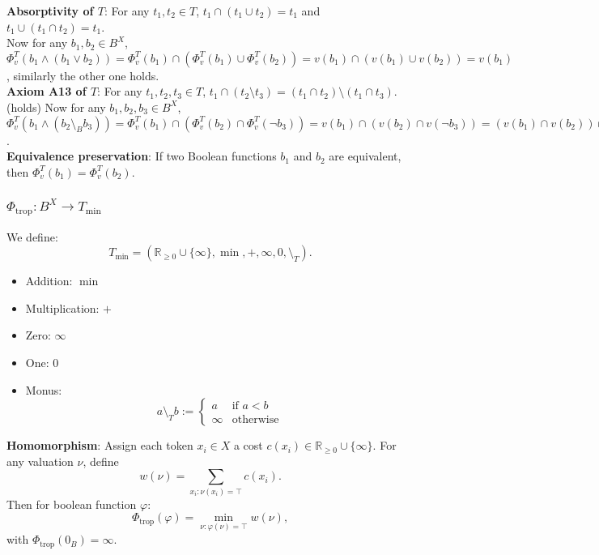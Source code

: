 \textbf{Absorptivity of $T$}:\newline
For any $t_1,t_2 \in T$, $t_1 \cap (t_1 \cup t_2) = t_1$ and $t_1 \cup (t_1 \cap t_2) = t_1$.\\
Now for any $b_1,b_2 \in B^X$, $\Phi_v^T(b_1 \wedge (b_1 \lor b_2)) = \Phi_v^T(b_1) \cap (\Phi_v^T(b_1) \cup \Phi_v^T(b_2)) = v(b_1) \cap (v(b_1) \cup v(b_2)) = v(b_1)$, similarly the other one holds.\\
\textbf{Axiom A13 of $T$}:\newline
For any $t_1,t_2,t_3 \in T$, $t_1 \cap (t_2 \setminus t_3) = (t_1 \cap t_2) \setminus (t_1 \cap t_3)$.\\ (holds)
Now for any $b_1,b_2,b_3 \in B^X$, $\Phi_v^T(b_1 \wedge (b_2 \setminus_B b_3)) = \Phi_v^T(b_1) \cap (\Phi_v^T(b_2) \cap \Phi_v^T(\neg b_3)) = v(b_1) \cap (v(b_2) \cap v(\neg b_3)) = (v(b_1) \cap v(b_2)) \cap (v(b_1) \cap ]-\infty,+\infty[ \setminus v(b_3)) = \Phi_v^T(b_1 \wedge b_2) \cup \Phi_v^T(b_1 \wedge b_3) = \Phi_v^T((b_1 \wedge b_2) \lor (b_1 \wedge b_3))$.\\
\textbf{Equivalence preservation}:\newline
If two Boolean functions $b_1$ and $b_2$ are equivalent, then $\Phi_v^T(b_1) = \Phi_v^T(b_2)$.


\subsubsection{$\Phi_{\mathrm{trop}}: B^X \to T_{\min}$}

We define:
$$
T_{\min} = (\mathbb{R}_{\ge 0} \cup \{\infty\},\min,+,\infty,0,\setminus_T).
$$
\begin{itemize}
    \item Addition: \(\min\)
    \item Multiplication: \(+\)
    \item Zero: \(\infty\)
    \item One: \(0\)
    \item Monus:
    \[
    a \setminus_T b :=
    \begin{cases}
        a & \text{if } a < b \\
        \infty & \text{otherwise}
    \end{cases}
    \]
\end{itemize}



\textbf{Homomorphism}:\newline
Assign each token \(x_i\in X\) a cost \(c(x_i)\in\mathbb{R}_{\ge0}\cup\{\infty\}\). For any valuation \(\nu\), define
$$
w(\nu) = \sum_{x_i:\nu(x_i)=\top} c(x_i).
$$
Then for boolean function  \(\varphi\):
$$
\Phi_{\mathrm{trop}}(\varphi) 
= \min_{\nu:\varphi(\nu)=\top} w(\nu),
$$
with \(\Phi_{\mathrm{trop}}(0_B)=\infty\).
\newline

